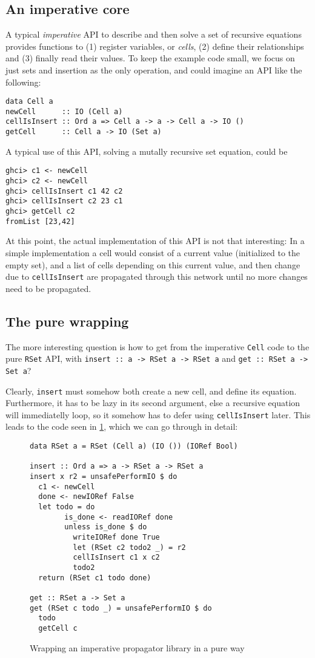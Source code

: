 \documentclass[manuscript,screen,acmsmall]{acmart}
\begin{document}
\subsection{An imperative core}

A typical \emph{imperative} API to describe and then solve a set of recursive equations provides functions to (1) register variables, or \emph{cells}, (2) define their relationships and (3) finally read their values. To keep the example code small, we focus on just sets and insertion as the only operation, and could imagine an API like the following:
\begin{verbatim}
data Cell a
newCell      :: IO (Cell a)
cellIsInsert :: Ord a => Cell a -> a -> Cell a -> IO ()
getCell      :: Cell a -> IO (Set a)
\end{verbatim}

A typical use of this API, solving a mutally recursive set equation, could be
\begin{verbatim}
ghci> c1 <- newCell
ghci> c2 <- newCell
ghci> cellIsInsert c1 42 c2
ghci> cellIsInsert c2 23 c1
ghci> getCell c2
fromList [23,42]
\end{verbatim}

At this point, the actual implementation of this API is not that interesting: In a simple implementation a cell would consist of a current value (initialized to the empty set), and a list of cells depending on this current value, and then change due to \verb|cellIsInsert| are propagated through this network until no more changes need to be propagated.

\subsection{The pure wrapping}

The more interesting question is how to get from the imperative \verb|Cell| code to the pure \verb|RSet| API, with \verb|insert :: a -> RSet a -> RSet a| and \verb|get :: RSet a -> Set a|?

Clearly, \verb|insert| must somehow both create a new cell, and define its equation.
Furthermore, it has to be lazy in its second argument, else a recursive equation will immediatelly loop, so it somehow has to defer using \verb|cellIsInsert| later. This leads to the code seen in \cref{fig:wrap}, which we can go through in detail:

\begin{figure}
\begin{verbatim}
data RSet a = RSet (Cell a) (IO ()) (IORef Bool)

insert :: Ord a => a -> RSet a -> RSet a
insert x r2 = unsafePerformIO $ do
  c1 <- newCell
  done <- newIORef False
  let todo = do
        is_done <- readIORef done
        unless is_done $ do
          writeIORef done True
          let (RSet c2 todo2 _) = r2
          cellIsInsert c1 x c2
          todo2
  return (RSet c1 todo done)

get :: RSet a -> Set a
get (RSet c todo _) = unsafePerformIO $ do
  todo
  getCell c
\end{verbatim}
\caption{Wrapping an imperative propagator library in a pure way}\label{fig:wrap}
\end{figure}
\end{document}
